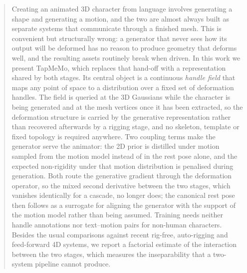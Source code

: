 \documentclass[lettersize,journal]{IEEEtran}
\begin{document}
\maketitle
\begin{abstract}
Creating an animated 3D character from language involves generating a shape and generating a motion, and the two are almost always built as separate systems that communicate through a finished mesh. This is convenient but structurally wrong: a generator that never sees how its output will be deformed has no reason to produce geometry that deforms well, and the resulting assets routinely break when driven. In this work we present TapMeMo, which replaces that hand-off with a representation shared by both stages. Its central object is a continuous \textit{handle field} that maps any point of space to a distribution over a fixed set of deformation handles. The field is queried at the 3D Gaussians while the character is being generated and at the mesh vertices once it has been extracted, so the deformation structure is carried by the generative representation rather than recovered afterwards by a rigging stage, and no skeleton, template or fixed topology is required anywhere. Two coupling terms make the generator serve the animator: the 2D prior is distilled under motion sampled from the motion model instead of in the rest pose alone, and the expected non-rigidity under that motion distribution is penalised during generation. Both route the generative gradient through the deformation operator, so the mixed second derivative between the two stages, which vanishes identically for a cascade, no longer does; the canonical rest pose then follows as a surrogate for aligning the generator with the support of the motion model rather than being assumed. Training needs neither handle annotations nor text--motion pairs for non-human characters. Besides the usual comparisons against recent rig-free, auto-rigging and feed-forward 4D systems, we report a factorial estimate of the interaction between the two stages, which measures the inseparability that a two-system pipeline cannot produce.

\end{abstract}
\end{document}

